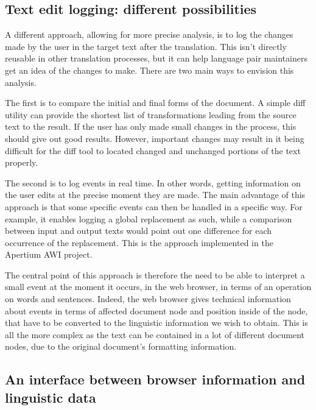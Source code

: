 \documentclass[11pt]{article}
\begin{document}


\subsection{Text edit logging: different possibilities}

A different approach, allowing for more precise analysis, is to log the 
changes made by the user in the target text after the translation. 
This isn't directly reusable in other translation processes, but it can 
help language pair maintainers get an idea of the changes to make.
There are two main ways to envision this analysis.

The first is to compare the initial and final forms of the document. 
A simple diff utility can provide the shortest list of transformations 
leading from the source text to the result. 
If the user has only made small changes in the process, this should give 
out good results. However, important changes may result in it being 
difficult for the diff tool to located changed and unchanged portions 
of the text properly.

The second is to log events in real time. In other words, getting
information on the user edits at the precise moment they are made.
The main advantage of this approach is that some specific events can  
then be handled in a specific way. For example, it enables logging a  
global replacement as such, while a comparison between input and output  
texts would point out one difference for each occurrence of the  
replacement.   
This is the approach implemented in the Apertium AWI project.
 
The central point of this approach is therefore the need to be able to 
interpret a small event at the moment it occurs, in the web browser, in 
terms of an operation on words and sentences. 
Indeed, the web browser gives technical information about events in terms 
of affected document node and position inside of the node, that have to 
be converted to the linguistic information we wish to obtain. 
This is all the more complex as the text can be contained in a lot of 
different document nodes, due to the original document's formatting 
information.

\subsection{An interface between browser information and linguistic data}
\end{document}
